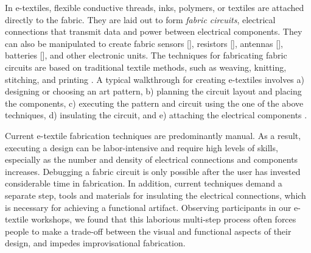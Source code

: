 \documentclass[header.tex]{subfiles}
\begin{document}
In e-textiles, flexible conductive threads, inks, polymers, or  textiles are attached directly to the fabric. They are laid out to form \textit{fabric circuits}, electrical connections that transmit data and power between electrical components. 
They can also be manipulated to create fabric sensors [], resistors [], antennas [], batteries [], and other electronic units. The techniques for fabricating fabric circuits are based on traditional textile methods, such as weaving, knitting, stitching, and printing \cite{castano2014smart}. A typical walkthrough for creating e-textiles involves a) designing or choosing an art pattern, b) planning the circuit layout and placing the components, c) executing the pattern and circuit using the one of the above techniques, d) insulating the circuit, and e) attaching the electrical components \cite{Buechley2009}.






Current e-textile fabrication techniques are predominantly manual. As a result, executing a design can be labor-intensive and require high levels of skills, especially as the number and density of electrical connections and components increases. Debugging a fabric circuit is only possible after the user has invested considerable time in fabrication. In addition, current techniques demand a separate step, tools and materials for insulating the electrical connections, which is necessary for achieving a functional artifact. %
Observing participants in our e-textile workshops, we found that this laborious multi-step process often forces people to make a trade-off between the visual and functional aspects of their design, and impedes improvisational fabrication. %


\end{document}
